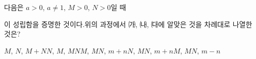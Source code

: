 다음은 $a>0$, $a\ne 1$, $M>0$, $N>0$일 때\par\smallskip{}\par\smallskip\noindent 이 성립함을 증명한 것이다.\noindent 위의 과정에서 ㈎, ㈏, ㈐에 알맞은 것을 차례대로 나열한 것은?
\begin{choicesii}{$M$, $N$, $M+N$}{$N$, $M$, $MN$}{$M$, $MN$, $m+n$}{$N$, $MN$, $m+n$}{$M$, $MN$, $m-n$}\end{choicesii}
